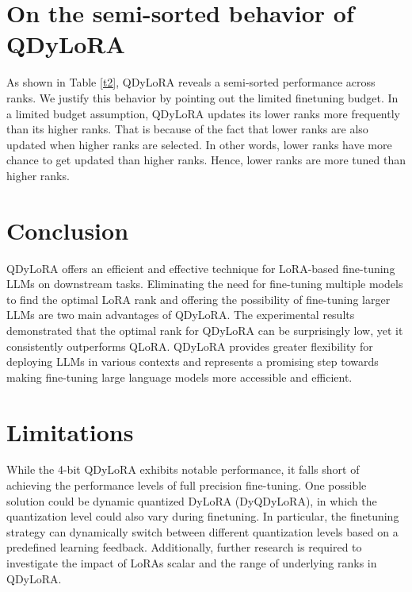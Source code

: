 \documentclass[11pt]{article}
\begin{document}
\section{On the semi-sorted behavior of QDyLoRA}
\label{sec:appendixB}
As shown in Table \ref{t2}, QDyLoRA reveals a semi-sorted performance across ranks. We justify this behavior by pointing out the limited finetuning budget. In a limited budget assumption, QDyLoRA updates its lower ranks more frequently than its higher ranks. That is because of the fact that lower ranks are also updated when higher ranks are selected. In other words, lower ranks have more chance to get updated than higher ranks. Hence, lower ranks are more tuned than higher ranks. 


\section{Conclusion}
QDyLoRA offers an efficient and effective technique for LoRA-based fine-tuning LLMs on downstream tasks. Eliminating the need for fine-tuning multiple models to find the optimal LoRA rank and offering the possibility of fine-tuning larger LLMs are two main advantages of QDyLoRA. The experimental results demonstrated that the optimal rank for QDyLoRA can be surprisingly low, yet it consistently outperforms QLoRA. QDyLoRA provides greater flexibility for deploying LLMs in various contexts and represents a promising step towards making fine-tuning large language models more accessible and efficient.

\section*{Limitations}
While the 4-bit QDyLoRA exhibits notable performance, it falls short of achieving the performance levels of full precision fine-tuning. One possible solution could be dynamic quantized DyLoRA (DyQDyLoRA), in which the quantization level could also vary during finetuning. In particular, the finetuning strategy can dynamically switch between different quantization levels based on a predefined learning feedback. Additionally, further research is required to investigate the impact of LoRA\textquotesingle s scalar and the range of underlying ranks in QDyLoRA.
\end{document}
